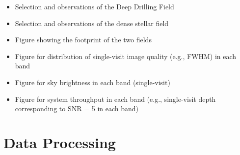 \begin{itemize}

\item Selection and observations of the Deep Drilling Field

\item Selection and observations of the dense stellar field

\item Figure showing the footprint of the two fields

\item Figure for distribution of single-visit image quality (e.g., FWHM) in each band

\item Figure for sky brightness in each band (single-visit) 

\item Figure for system throughput in each band (e.g., single-visit depth corresponding to SNR = 5 in each band)

\end{itemize}








\section{Data Processing}

